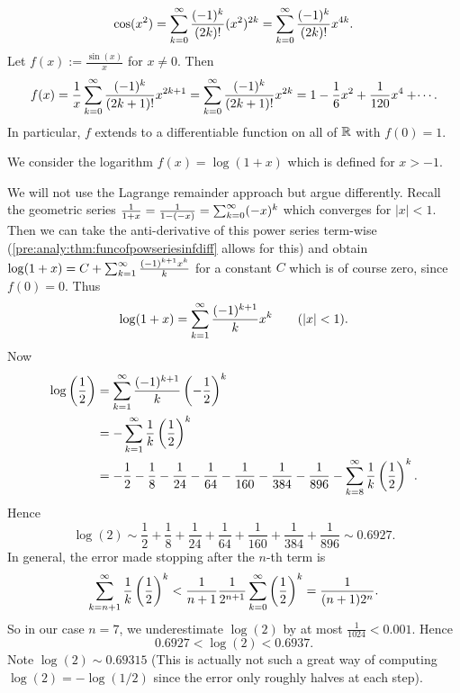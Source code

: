 \documentclass[10pt, a4paper]{article}
\begin{document}
\begin{example}
    \[
    \cos(x ^ 2) = \infsumo\frac{(-1) ^ k}{(2k)!}(x ^ 2) ^ {2k} = \infsumo\frac{(-1) ^ k}{(2k)!}x ^ {4k}.
    \]
    Let $f(x) := \frac{\sin(x)}{x}$ for $x \neq 0$.
    Then
    \[
    f(x) = \frac{1}{x}\infsumo\frac{(-1) ^ k}{(2k + 1)!}x ^ {2k + 1} = \infsumo\frac{(-1) ^ k}{(2k + 1)!}x ^ {2k} = 1 - \frac{1}{6}x ^ 2 + \frac{1}{120}x ^ 4 + \dotsi.
    \]
    In particular,
    $f$ extends to a differentiable function on all of $\R$ with $f(0) = 1$.
\end{example}

\begin{example}[Logarithm]
    We consider the logarithm $f(x) = \log(1 + x)$ which is defined for $x > -1$.

    We will not use the Lagrange remainder approach but argue differently.
    Recall the geometric series $\frac{1}{1 + x} = \frac{1}{1 - (-x)} = \infsumo(-x) ^ k$ which converges for $|x| < 1$.
    Then we can take the anti-derivative of this power series term-wise
    (\autoref{pre:analy:thm:funcofpowseriesinfdiff} allows for this)
    and obtain $\log(1 + x) = C + \infsum\frac{(-1) ^ {k + 1}x ^ k}{k}$ for a constant $C$ which is of course zero,
    since $f(0) = 0$.
    Thus
    \[
    \log(1 + x) = \infsum\frac{(-1) ^ {k + 1}}{k}x ^ k\qquad(|x| < 1).
    \]
    Now
    \begin{align*}
        \log\left(\frac{1}{2}\right) &= \infsum\frac{(-1) ^ {k + 1}}{k}\left(-\frac{1}{2}\right) ^ k \\
        &= -\infsum\frac{1}{k}\left(\frac{1}{2}\right) ^ k \\
        &= -\frac{1}{2} - \frac{1}{8} - \frac{1}{24} - \frac{1}{64} - \frac{1}{160} - \frac{1}{384} - \frac{1}{896} - \infsum[k = 8]\frac{1}{k}\left(\frac{1}{2}\right) ^ k.
    \end{align*}
    Hence
    \[
    \log(2) \sim \frac{1}{2} + \frac{1}{8} + \frac{1}{24} + \frac{1}{64} + \frac{1}{160} + \frac{1}{384} + \frac{1}{896} \sim 0.6927.
    \]
    In general,
    the error made stopping after the $n$-th term is
    \[
    \infsum[k = n + 1]\frac{1}{k}\left(\frac{1}{2}\right) ^ k < \frac{1}{n + 1}\frac{1}{2 ^ {n + 1}}\infsumo\left(\frac{1}{2}\right) ^ k = \frac{1}{(n + 1)2 ^ n}.
    \]
    So in our case $n = 7$,
    we underestimate $\log(2)$ by at most $\frac{1}{1024} < 0.001$.
    Hence
    \[
    0.6927 < \log(2) < 0.6937.
    \]
    Note $\log(2) \sim 0.69315$
    (This is actually not such a great way of computing $\log(2) = -\log(1 / 2)$ since the error only roughly halves at each step).
    

\end{example}
\end{document}
